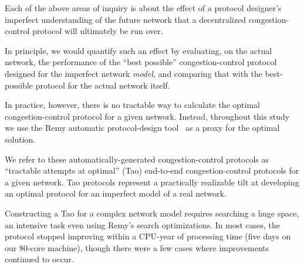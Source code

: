 Each of the above areas of inquiry is about the effect of a protocol
designer's imperfect understanding of the future network that a
decentralized congestion-control protocol will ultimately be run over.

In principle, we would quantify such an effect by evaluating, on the
actual network, the performance of the ``best possible''
congestion-control protocol designed for the imperfect network
\emph{model}, and comparing that with the best-possible protocol for
the actual network itself.

In practice, however, there is no tractable way to calculate the
optimal congestion-control protocol for a given network. Instead,
throughout this study we use the Remy automatic protocol-design
tool~\cite{remy} as a proxy for the optimal solution.

We refer to these automatically-generated congestion-control protocols
as ``tractable attempts at optimal'' (Tao) end-to-end
congestion-control protocols for a given network.  Tao protocols
represent a practically realizable tilt at developing an optimal
protocol for an imperfect model of a real network.

Constructing a Tao for a complex network model requires searching a
huge space, an intensive task even using Remy's search
optimizations. In most cases, the protocol stopped improving within a
CPU-year of processing time (five days on our 80-core machine), though
there were a few cases where improvements continued to occur.


